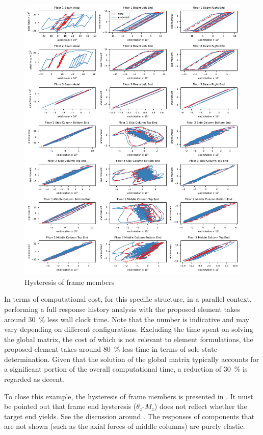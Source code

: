 \begin{figure}[p]
\centering\footnotesize
\includegraphics[width=.99\textwidth]{MODELS/FRAME/RESULT/FRAME.RESULT}
\caption{Hysteresis of frame members}\label{fig:hys}
\end{figure}
In terms of computational cost, for this specific structure, in a parallel context, performing a full response history analysis with the proposed element takes around \SI{30}{\percent} less wall clock time. Note that the number is indicative and may vary depending on different configurations. Excluding the time spent on solving the global matrix, the cost of which is not relevant to element formulations, the proposed element takes around \SI{80}{\percent} less time in terms of sole state determination. Given that the solution of the global matrix typically accounts for a significant portion of the overall computational time, a reduction of \SI{30}{\percent} is regarded as decent.

To close this example, the hysteresis of frame members is presented in .
It must be pointed out that frame end hysteresis ($\theta_z$-$M_z$) does not reflect whether the target end yields. See the discussion around .
The responses of components that are not shown (such as the axial forces of middle columns) are purely elastic.


